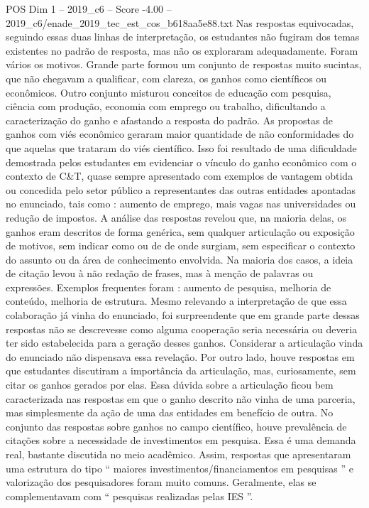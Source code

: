 \begin{textsample}{POS Dim 1 – 2019\_c6 – Score -4.00 – 2019\_c6/enade\_2019\_tec\_est\_cos\_b618aa5e88.txt}
Nas respostas equivocadas, seguindo essas duas linhas de interpretação, os estudantes não fugiram dos temas existentes no padrão de resposta, mas não os exploraram adequadamente.
Foram vários os motivos.
Grande parte formou um conjunto de respostas muito sucintas, que não chegavam a qualificar, com clareza, os ganhos como científicos ou econômicos.
Outro conjunto misturou conceitos de educação com pesquisa, ciência com produção, economia com emprego ou trabalho, dificultando a caracterização do ganho e afastando a resposta do padrão.
As propostas de ganhos com viés econômico geraram maior quantidade de não conformidades do que aquelas que trataram do viés científico.
Isso foi resultado de uma dificuldade demostrada pelos estudantes em evidenciar o vínculo do ganho econômico com o contexto de C\&T, quase sempre apresentado com exemplos de vantagem obtida ou concedida pelo setor público a representantes das outras entidades apontadas no enunciado, tais como : aumento de emprego, mais vagas nas universidades ou redução de impostos.
A análise das respostas revelou que, na maioria delas, os ganhos eram descritos de forma genérica, sem qualquer articulação ou exposição de motivos, sem indicar como ou de de onde surgiam, sem especificar o contexto do assunto ou da área de conhecimento envolvida.
Na maioria dos casos, a ideia de citação levou à não redação de frases, mas à menção de palavras ou expressões.
Exemplos frequentes foram : aumento de pesquisa, melhoria de conteúdo, melhoria de estrutura.
Mesmo relevando a interpretação de que essa colaboração já vinha do enunciado, foi surpreendente que em grande parte dessas respostas não se descrevesse como alguma cooperação seria necessária ou deveria ter sido estabelecida para a geração desses ganhos.
Considerar a articulação vinda do enunciado não dispensava essa revelação.
Por outro lado, houve respostas em que estudantes discutiram a importância da articulação, mas, curiosamente, sem citar os ganhos gerados por elas.
Essa dúvida sobre a articulação ficou bem caracterizada nas respostas em que o ganho descrito não vinha de uma parceria, mas simplesmente da ação de uma das entidades em benefício de outra.
No conjunto das respostas sobre ganhos no campo científico, houve prevalência de citações sobre a necessidade de investimentos em pesquisa.
Essa é uma demanda real, bastante discutida no meio acadêmico.
Assim, respostas que apresentaram uma estrutura do tipo “ maiores investimentos/financiamentos em pesquisas ” e valorização dos pesquisadores foram muito comuns.
Geralmente, elas se complementavam com “ pesquisas realizadas pelas IES ”.

\end{textsample}
